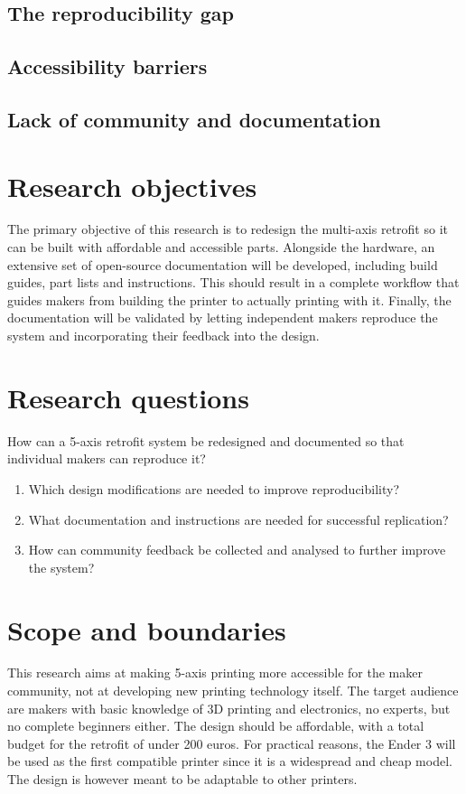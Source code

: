 \subsection{The reproducibility gap}
\label{subsec:intro-reproducibility-gap}

\subsection{Accessibility barriers}
\label{subsec:intro-accessibility-barriers}

\subsection{Lack of community and documentation}
\label{subsec:intro-lack-community}

\section{Research objectives}
\label{sec:intro-objectives}
The primary objective of this research is to redesign the multi-axis retrofit so it can be built with affordable and accessible parts. Alongside the hardware, an extensive set of open-source documentation will be developed, including build guides, part lists and instructions. This should result in a complete workflow that guides makers from building the printer to actually printing with it. Finally, the documentation will be validated by letting independent makers reproduce the system and incorporating their feedback into the design.

\section{Research questions}
\label{sec:intro-rq}
How can a 5-axis retrofit system be redesigned and documented so that individual makers can reproduce it?
\begin{enumerate}
    \item Which design modifications are needed to improve reproducibility?
    \item What documentation and instructions are needed for successful replication?
    \item How can community feedback be collected and analysed to further improve the system?
\end{enumerate}

\section{Scope and boundaries}
\label{sec:intro-scope}
This research aims at making 5-axis printing more accessible for the maker community, not at developing new printing technology itself. The target audience are makers with basic knowledge of 3D printing and electronics, no experts, but no complete beginners either. The design should be affordable, with a total budget for the retrofit of under 200 euros. For practical reasons, the Ender 3 will be used as the first compatible printer since it is a widespread and cheap model. The design is however meant to be adaptable to other printers.

